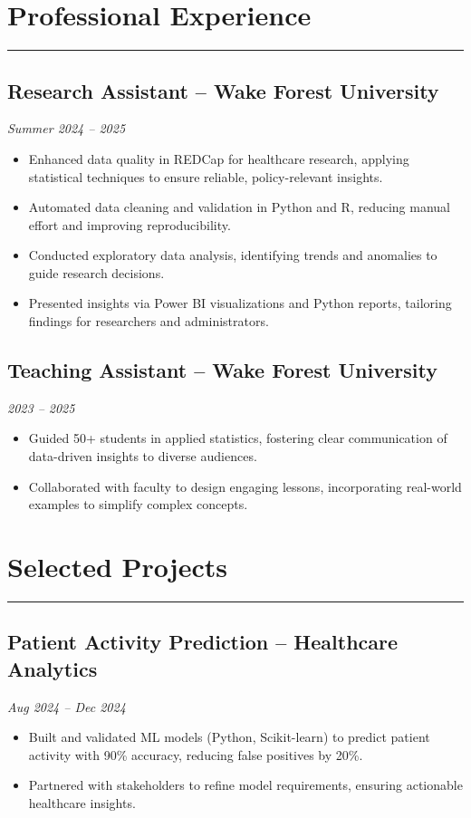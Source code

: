 \documentclass[a4paper,11pt]{article}
\begin{document}
\section*{Professional Experience}
\hrule \vspace{2mm}
\subsection*{Research Assistant – Wake Forest University}
\textit{Summer 2024 – 2025}
\begin{itemize}
    \item Enhanced data quality in REDCap for healthcare research, applying statistical techniques to ensure reliable, policy-relevant insights.
    \item Automated data cleaning and validation in Python and R, reducing manual effort and improving reproducibility.
    \item Conducted exploratory data analysis, identifying trends and anomalies to guide research decisions.
    \item Presented insights via Power BI visualizations and Python reports, tailoring findings for researchers and administrators.
\end{itemize}

\subsection*{Teaching Assistant – Wake Forest University}
\textit{2023 – 2025}
\begin{itemize}
    \item Guided 50+ students in applied statistics, fostering clear communication of data-driven insights to diverse audiences.
    \item Collaborated with faculty to design engaging lessons, incorporating real-world examples to simplify complex concepts.
\end{itemize}

\section*{Selected Projects}
\hrule \vspace{2mm}
\subsection*{Patient Activity Prediction – Healthcare Analytics}
\textit{Aug 2024 – Dec 2024}
\begin{itemize}
    \item Built and validated ML models (Python, Scikit-learn) to predict patient activity with 90\% accuracy, reducing false positives by 20\%.
    \item Partnered with stakeholders to refine model requirements, ensuring actionable healthcare insights.
\end{itemize}
\end{document}
